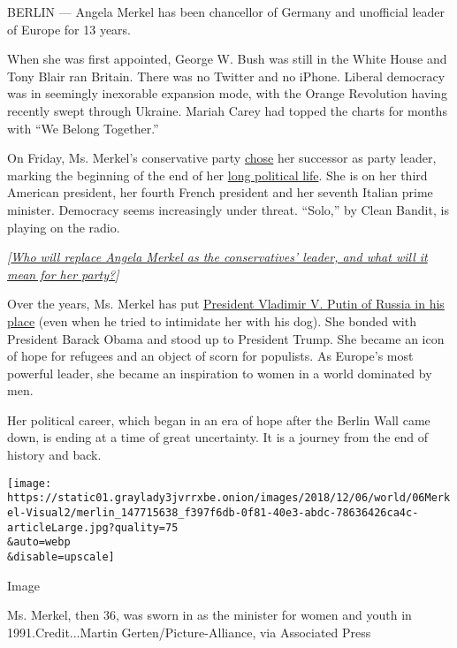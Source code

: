 BERLIN --- Angela Merkel has been chancellor of Germany and unofficial
leader of Europe for 13 years.

When she was first appointed, George W. Bush was still in the White
House and Tony Blair ran Britain. There was no Twitter and no iPhone.
Liberal democracy was in seemingly inexorable expansion mode, with the
Orange Revolution having recently swept through Ukraine. Mariah Carey
had topped the charts for months with ``We Belong Together.''

On Friday, Ms. Merkel's conservative party
\href{https://www.nytimes3xbfgragh.onion/2018/11/18/world/europe/merkel-germany-conservatives.html}{chose}
her successor as party leader, marking the beginning of the end of her
\href{https://www.nytimes3xbfgragh.onion/2018/12/05/world/europe/merkel-legacy-germany.html?action=click\&module=Top\%20Stories\&pgtype=Homepage}{long
political life}. She is on her third American president, her fourth
French president and her seventh Italian prime minister. Democracy seems
increasingly under threat. ``Solo,'' by Clean Bandit, is playing on the
radio.

\emph{{[}}\href{https://www.nytimes3xbfgragh.onion/2018/12/06/world/europe/germany-conservatives-angela-merkel.html}{\emph{Who
will replace Angela Merkel as the conservatives' leader, and what will
it mean for her party?}}\emph{{]}}

Over the years, Ms. Merkel has put
\href{https://www.nytimes3xbfgragh.onion/2017/03/12/world/europe/vladimir-putin-angela-merkel-russia-germany.html}{President
Vladimir V. Putin of Russia in his place} (even when he tried to
intimidate her with his dog). She bonded with President Barack Obama and
stood up to President Trump. She became an icon of hope for refugees and
an object of scorn for populists. As Europe's most powerful leader, she
became an inspiration to women in a world dominated by men.

Her political career, which began in an era of hope after the Berlin
Wall came down, is ending at a time of great uncertainty. It is a
journey from the end of history and back.

\texttt{[image: https://static01.graylady3jvrrxbe.onion/images/2018/12/06/world/06Merkel-Visual2/merlin\_147715638\_f397f6db-0f81-40e3-abdc-78636426ca4c-articleLarge.jpg?quality=75\\\&auto=webp\\\&disable=upscale]}

Image

Ms. Merkel, then 36, was sworn in as the minister for women and youth in
1991.Credit...Martin Gerten/Picture-Alliance, via Associated Press

